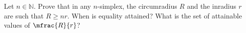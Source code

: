 Let $n \in \mathbb{N}$.
Prove that in any $n$-simplex,
the circumradius $R$ and the inradius $r$
are such that $R \geq n r$.\newline
When is equality attained?\newline
What is the set of attainable values of $\mfrac{R}{r}$?
